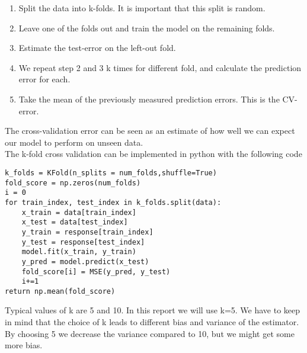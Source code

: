\begin{enumerate}
    \item Split the data into k-folds. It is important that this split is random. 
    \item Leave one of the folds out and train the model on the remaining folds.
    \item Estimate the test-error on the left-out fold.
    \item We repeat step 2 and 3 k times for different fold, and calculate the prediction error for each.
    \item Take the mean of the previously measured prediction errors. This is the CV-error. 
\end{enumerate}
The cross-validation error can be seen as an estimate of how well we can expect our model to perform on unseen data. 
\\
The k-fold cross validation can be implemented in python with the following code
\begin{lstlisting}
k_folds = KFold(n_splits = num_folds,shuffle=True)
fold_score = np.zeros(num_folds)
i = 0
for train_index, test_index in k_folds.split(data):
    x_train = data[train_index]
    x_test = data[test_index]
    y_train = response[train_index]
    y_test = response[test_index]
    model.fit(x_train, y_train)
    y_pred = model.predict(x_test)
    fold_score[i] = MSE(y_pred, y_test)
    i+=1
return np.mean(fold_score)
\end{lstlisting}
Typical values of k are 5 and 10. In this report we will use k=5. We have to keep in mind that the choice of k leads to different bias and variance of the estimator. By choosing 5 we decrease the variance compared to 10, but we might get some more bias.\cite{hastie}

